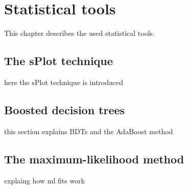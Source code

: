 \chapter{Statistical tools}
\label{chap:tools}

\linespread{1.08}\selectfont
This chapter describes the used statistical tools.

\section{The sPlot technique}
here the sPlot technique is introduced

\section{Boosted decision trees}

this section explains BDTs and the AdaBoost method

\section{The maximum-likelihood method}
explaing how ml fits work
